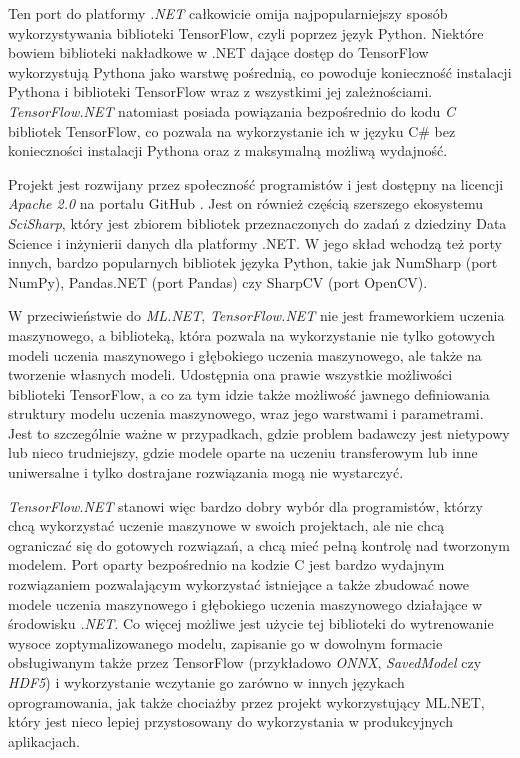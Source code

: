 Ten port do platformy \emph{.NET} całkowicie omija najpopularniejszy sposób wykorzystywania biblioteki TensorFlow, czyli poprzez język Python.
Niektóre bowiem biblioteki nakładkowe w .NET dające dostęp do TensorFlow wykorzystują Pythona jako warstwę pośrednią, co powoduje konieczność instalacji Pythona i biblioteki TensorFlow wraz z wszystkimi jej zależnościami.
\emph{TensorFlow.NET} natomiast posiada powiązania bezpośrednio do kodu \emph{C} bibliotek TensorFlow, co pozwala na wykorzystanie ich w języku C\# bez konieczności instalacji Pythona oraz z maksymalną możliwą wydajność.

Projekt jest rozwijany przez społeczność programistów i jest dostępny na licencji \emph{Apache 2.0} na portalu GitHub \cite{scisharp-tensorflownet-repo}.
Jest on również częścią szerszego ekosystemu \emph{SciSharp}, który jest zbiorem bibliotek przeznaczonych do zadań z dziedziny Data Science i inżynierii danych dla platformy .NET.
W jego skład wchodzą też porty innych, bardzo popularnych bibliotek języka Python, takie jak NumSharp (port NumPy), Pandas.NET (port Pandas) czy SharpCV (port OpenCV).

W przeciwieństwie do \emph{ML.NET}, \emph{TensorFlow.NET} nie jest frameworkiem uczenia maszynowego, a biblioteką, która pozwala na wykorzystanie nie tylko gotowych modeli uczenia maszynowego i głębokiego uczenia maszynowego, ale także na tworzenie własnych modeli.
Udostępnia ona prawie wszystkie możliwości biblioteki TensorFlow, a co za tym idzie także możliwość jawnego definiowania struktury modelu uczenia maszynowego, wraz jego warstwami i parametrami.
Jest to szczególnie ważne w przypadkach, gdzie problem badawczy jest nietypowy lub nieco trudniejszy, gdzie modele oparte na uczeniu transferowym lub inne uniwersalne i tylko dostrajane rozwiązania mogą nie wystarczyć.

\emph{TensorFlow.NET} stanowi więc bardzo dobry wybór dla programistów, którzy chcą wykorzystać uczenie maszynowe w swoich projektach, ale nie chcą ograniczać się do gotowych rozwiązań, a chcą mieć pełną kontrolę nad tworzonym modelem.
Port oparty bezpośrednio na kodzie C jest bardzo wydajnym rozwiązaniem pozwalającym wykorzystać istniejące a także zbudować nowe modele uczenia maszynowego i głębokiego uczenia maszynowego działające w środowisku \emph{.NET}.
Co więcej możliwe jest użycie tej biblioteki do wytrenowanie wysoce zoptymalizowanego modelu, zapisanie go w dowolnym formacie obsługiwanym także przez TensorFlow (przykładowo \emph{ONNX}, \emph{SavedModel} czy \emph{HDF5}) i wykorzystanie wczytanie go zarówno w innych językach oprogramowania, jak także chociażby przez projekt wykorzystujący ML.NET, który jest nieco lepiej przystosowany do wykorzystania w produkcyjnych aplikacjach.

